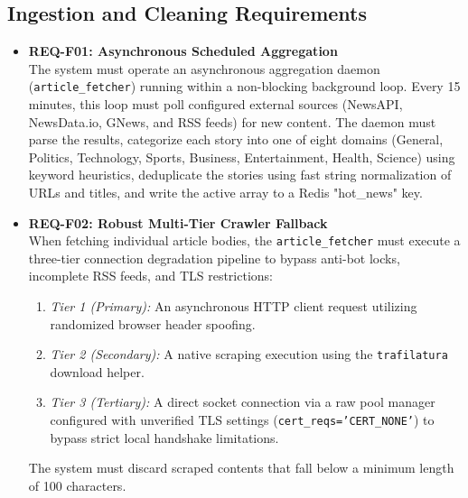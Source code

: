 \subsection{Ingestion and Cleaning Requirements}
\begin{itemize}
    \item \textbf{REQ-F01: Asynchronous Scheduled Aggregation} \\
    The system must operate an asynchronous aggregation daemon (\texttt{article\_fetcher}) running within a non-blocking background loop. Every 15 minutes, this loop must poll configured external sources (NewsAPI, NewsData.io, GNews, and RSS feeds) for new content. The daemon must parse the results, categorize each story into one of eight domains (General, Politics, Technology, Sports, Business, Entertainment, Health, Science) using keyword heuristics, deduplicate the stories using fast string normalization of URLs and titles, and write the active array to a Redis "hot\_news" key.
    \item \textbf{REQ-F02: Robust Multi-Tier Crawler Fallback} \\
    When fetching individual article bodies, the \texttt{article\_fetcher} must execute a three-tier connection degradation pipeline to bypass anti-bot locks, incomplete RSS feeds, and TLS restrictions:
    \begin{enumerate}
        \item \textit{Tier 1 (Primary):} An asynchronous HTTP client request utilizing randomized browser header spoofing.
        \item \textit{Tier 2 (Secondary):} A native scraping execution using the \texttt{trafilatura} download helper.
        \item \textit{Tier 3 (Tertiary):} A direct socket connection via a raw pool manager configured with unverified TLS settings (\texttt{cert\_reqs='CERT\_NONE'}) to bypass strict local handshake limitations.
    \end{enumerate}
    The system must discard scraped contents that fall below a minimum length of 100 characters.
\end{itemize}

